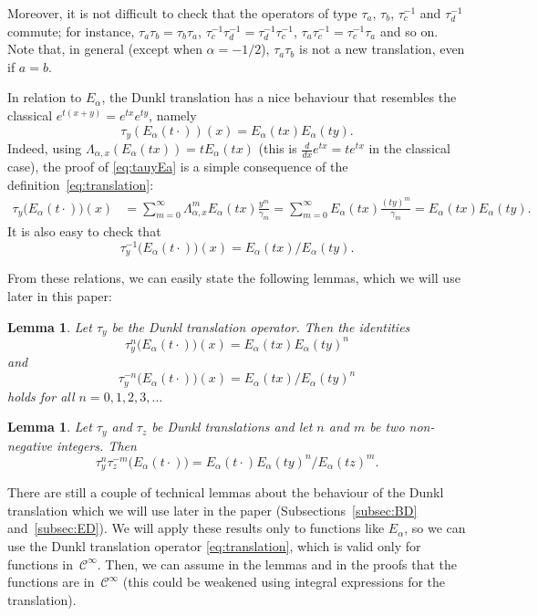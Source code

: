 \documentclass[a4paper]{amsart}
\newcommand{\Ea}{E_{\alpha}}
\newcommand{\cc}{\gamma}
\newcommand{\Lax}{\Lambda_{\alpha,x}}
\theoremstyle{plain}
\newtheorem{lemma}[theorem]{Lemma}
\theoremstyle{definition}
\theoremstyle{remark}
\numberwithin{equation}{section}
\begin{document}
Moreover, it is not difficult to check that the operators of type $\tau_a$, $\tau_b$, $\tau_c^{-1}$ and $\tau_d^{-1}$ commute; for instance, $\tau_a \tau_b = \tau_b \tau_a$, $\tau_c^{-1} \tau_d^{-1} = \tau_d^{-1} \tau_c^{-1}$, $\tau_a \tau_c^{-1} = \tau_c^{-1} \tau_a$ and so on. Note that, in general (except when $\alpha=-1/2$), $\tau_a \tau_b$ is not a new translation, even if $a = b$. 

In relation to $\Ea$, the Dunkl translation has a nice behaviour that resembles the classical $e^{t(x+y)} = e^{tx} e^{ty}$, namely
\begin{equation}
\label{eq:tauyEa}
  \tau_y (\Ea(t \cdot))(x) = \Ea(t x)\Ea(t y).
\end{equation}
Indeed, using $\Lax (\Ea(tx)) = t \Ea(tx)$ (this is $\frac{d}{dx} e^{tx} = t e^{tx}$ 
in the classical case), the proof of \eqref{eq:tauyEa} is a simple consequence
of the definition~\eqref{eq:translation}:
\begin{align*}
  \tau_y \big(\Ea(t\cdot)\big)(x)
  &= \sum_{m=0}^{\infty} \Lambda_{\alpha,x}^m \Ea(tx) \frac{y^m}{\cc_m}
= \sum_{m=0}^{\infty} \Ea(tx) \frac{(ty)^m}{\cc_m} 
  = \Ea(tx) \Ea(ty).
\end{align*}
It is also easy to check that
\[
\tau_y^{-1} \big( \Ea(t\cdot) \big)(x)  = \Ea(tx)/ \Ea(ty).
\] 

From these relations, we can easily state the following lemmas, which we will use later in this paper:

\begin{lemma}
\label{lem:tau-n-n}
Let $\tau_y$ be the Dunkl translation operator. Then the identities
\[
\tau_y^n \big( \Ea(t\cdot) \big)(x) = \Ea(tx)\Ea(ty)^n
\]
and
\[
\tau_y^{-n} \big( \Ea(t\cdot) \big)(x)  = \Ea(tx)/ \Ea(ty)^n
\] 
holds for all $n = 0,1,2,3,\dots$
\end{lemma}

\begin{lemma}
\label{lem:tau-n-m}
Let $\tau_y$ and $\tau_z$ be Dunkl translations and let $n$ and $m$ be two non-negative integers. Then
\[
\tau_y^n \tau_z^{-m} \big( \Ea(t\cdot) \big) = \Ea(t\cdot)\Ea(ty)^n/\Ea(tz)^{m}. 
\]
\end{lemma}

There are still a couple of technical lemmas about the behaviour of the Dunkl translation which we will use later in the paper (Subsections~\ref{subsec:BD} and~\ref{subsec:ED}). We will apply these results only to functions like $\Ea$, so we can use the Dunkl translation operator \eqref{eq:translation}, which is valid only for functions in~$\mathcal{C}^{\infty}$. Then, we can assume in the lemmas and in the proofs that the functions are in~$\mathcal{C}^{\infty}$ (this could be weakened using integral expressions for the translation).
\end{document}
